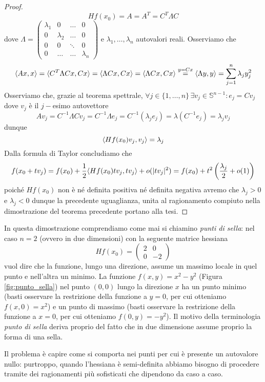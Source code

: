 \begin{proof}
$$
Hf(x_0)=A=A^T=C^T \Lambda C
$$
dove $\Lambda = \begin{pmatrix} \lambda_1 & 0 & \ldots & 0 \\
0 & \lambda_2 & \ldots & 0 \\
0 & 0 & \ddots & 0 \\ 0 & \ldots & \ldots & \lambda_n \end{pmatrix}$ e $\lambda_1, \ldots, \lambda_n$ autovalori reali. Osserviamo che
$$
\langle Ax, x \rangle = \langle C^T \Lambda Cx, Cx \rangle = \langle \Lambda Cx, Cx \rangle =  \langle \Lambda Cx, Cx \rangle \stackrel{y=Cx}{=} \langle \Lambda y, y \rangle = \sum_{j=1}^n \lambda_j y_j^2
$$
Osserviamo che, grazie al teorema spettrale, $\forall j \in \{1, \ldots, n \} \, \exists v_j \in \mathbb{S}^{n-1} : e_j = Cv_j$ dove $v_j$ è il $j-$esimo autovettore
$$
Av_j = C^{-1} \Lambda Cv_j = C^{-1} \Lambda e_j = C^{-1} (\lambda_j e_j) = \lambda (C^{-1} e_j) = \lambda_j v_j
$$
dunque
$$
\langle Hf(x_0)v_j, v_j \rangle = \lambda_j
$$
Dalla formula di Taylor concludiamo che
$$
f(x_0 + tv_j) = f(x_0) + \frac{1}{2} \langle Hf(x_0)tv_j, tv_j \rangle + o(|tv_j|^2) = f(x_0) + t^2 \left( \frac{\lambda_j}{2} + o(1) \right)
$$
poiché $Hf(x_0)$ non è né definita positiva né definita negativa avremo che $\lambda_j > 0$ e $\lambda_j < 0$ dunque la precedente uguaglianza, unita al ragionamento compiuto nella dimostrazione del teorema precedente portano alla tesi.
\end{proof}
\begin{remark}
In questa dimostrazione comprendiamo come mai si chiamino \emph{punti di sella}: nel caso $n=2$ (ovvero in due dimensioni) con la seguente matrice hessiana
$$
Hf(x_0) = \begin{pmatrix}
2 & 0 \\
0 & -2
\end{pmatrix}
$$
vuol dire che la funzione, lungo una direzione, assume un massimo locale in quel punto e nell'altra un minimo. La funzione $f(x,y)=x^2-y^2$ (Figura \ref{fig:punto_sella}) nel punto $(0,0)$ lungo la direzione $x$ ha un punto minimo (basti osservare la restrizione della funzione a $y=0$, per cui otteniamo $f(x, 0)=x^2$) e un punto di massimo (basti osservare la restrizione della funzione a $x=0$, per cui otteniamo $f(0, y) = -y^2$). Il motivo della terminologia \emph{punto di sella} deriva proprio del fatto che in due dimensione assume proprio la forma di una sella.
\end{remark}
Il problema è capire come si comporta nei punti per cui è presente un autovalore nullo: purtroppo, quando l'hessiana è semi-definita abbiamo bisogno di procedere tramite dei ragionamenti più sofisticati che dipendono da caso a caso.